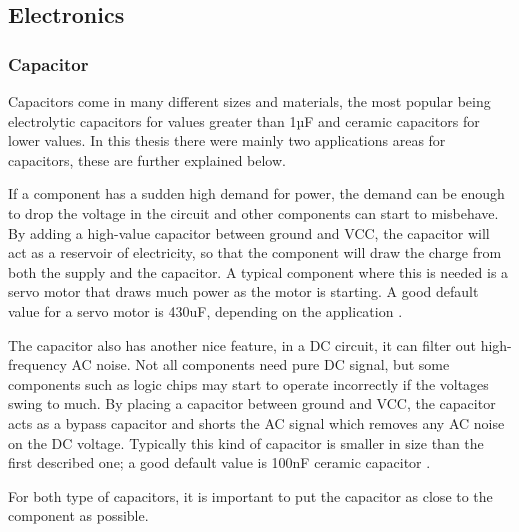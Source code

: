 \subsection{Electronics}
\subsubsection{Capacitor}
\label{sec:capacitor}
Capacitors come in many different sizes and materials, the most popular being electrolytic capacitors for values greater than 1µF and ceramic capacitors for lower values. In this thesis there were mainly two applications areas for capacitors, these are further explained below.

If a component has a sudden high demand for power, the demand can be enough to drop the voltage in the circuit and other components can start to misbehave. By adding a high-value capacitor between ground and VCC, the capacitor will act as a reservoir of electricity, so that the component will draw the charge from both the supply and the capacitor. A typical component where this is needed is a servo motor that draws much power as the motor is starting. A good default value for a servo motor is 430uF, depending on the application \cite{highcapacitor}.

The capacitor also has another nice feature, in a DC circuit, it can filter out high-frequency AC noise. Not all components need pure DC signal, but some components such as logic chips may start to operate incorrectly if the voltages swing to much. By placing a capacitor between ground and VCC, the capacitor acts as a bypass capacitor and shorts the AC signal which removes any AC noise on the DC voltage. Typically this kind of capacitor is smaller in size than the first described one; a good default value is 100nF ceramic capacitor \cite{lowcapacitor}.

For both type of capacitors, it is important to put the capacitor as close to the component as possible.